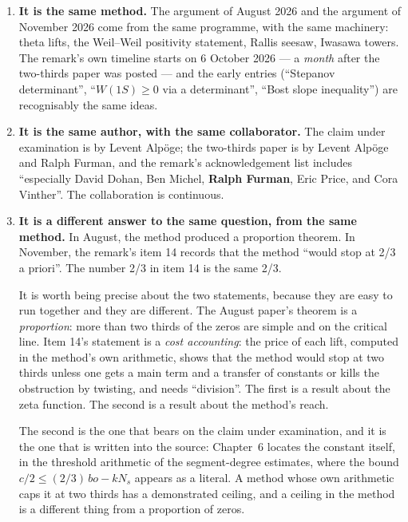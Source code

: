 \begin{enumerate}
\item \textbf{It is the same method.} The argument of August 2026 and the
argument of November 2026 come from the same programme, with the same
machinery: theta lifts, the Weil--Weil positivity statement, Rallis seesaw,
Iwasawa towers. The remark's own timeline starts on 6 October 2026 --- a
\emph{month} after the two-thirds paper was posted --- and the early entries
(``Stepanov determinant'', ``$W(1S) \ge 0$ via a determinant'',
``Bost slope inequality'') are recognisably the same ideas.

\item \textbf{It is the same author, with the same collaborator.} The claim
under examination is by Levent Alpöge; the two-thirds paper is by Levent
Alpöge and Ralph Furman, and the remark's acknowledgement list includes
``especially David Dohan, Ben Michel, \textbf{Ralph Furman}, Eric Price, and
Cora Vinther''. The collaboration is continuous.

\item \textbf{It is a different answer to the same question, from the same
method.} In August, the method produced a proportion theorem. In November, the
remark's item 14 records that the method ``would stop at 2/3 a priori''. The
number 2/3 in item 14 is the same 2/3.

It is worth being precise about the two statements, because they are easy to
run together and they are different. The August paper's theorem is a
\emph{proportion}: more than two thirds of the zeros are simple and on the
critical line. Item 14's statement is a \emph{cost accounting}: the price of
each lift, computed in the method's own arithmetic, shows that the method
would stop at two thirds unless one gets a main term and a transfer of
constants or kills the obstruction by twisting, and needs ``division''. The
first is a result about the zeta function. The second is a result about the
method's reach.

The second is the one that bears on the claim under examination, and it is
the one that is written into the source: Chapter~6 locates the constant
itself, in the threshold arithmetic of the segment-degree estimates, where
the bound $c/2 \le (2/3)\,bo - kN_s$ appears as a literal. A method whose
own arithmetic caps it at two thirds has a demonstrated ceiling, and a ceiling
in the method is a different thing from a proportion of zeros.
\end{enumerate}


